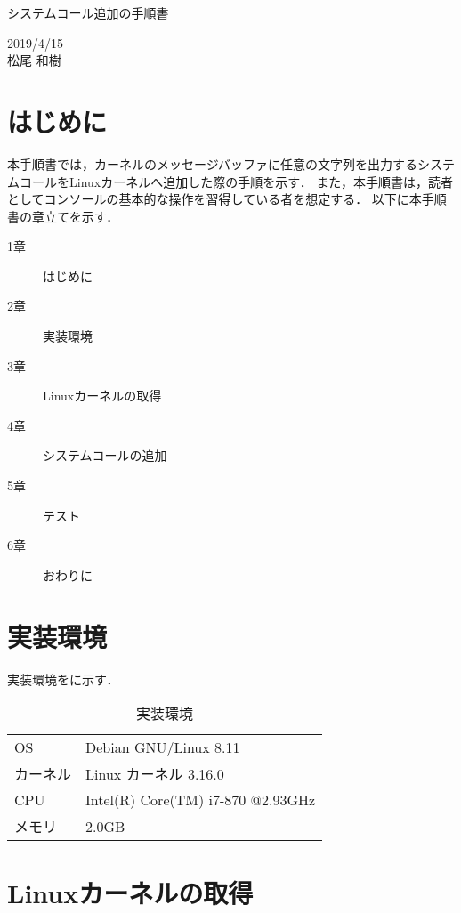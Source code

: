 \documentclass[12pt]{jsarticle}
\begin{document}
\begin{center}
{\LARGE システムコール追加の手順書}
\end{center}

\begin{flushright}
  2019/4/15\\
  松尾 和樹
\end{flushright}
\section{はじめに}
\label{sec:introduction}
本手順書では，カーネルのメッセージバッファに任意の文字列を出力するシステムコールをLinuxカーネルへ追加した際の手順を示す．
また，本手順書は，読者としてコンソールの基本的な操作を習得している者を想定する．
以下に本手順書の章立てを示す．
\begin{description}
\item[1章] はじめに
\item[2章] 実装環境
\item[3章] Linuxカーネルの取得
\item[4章] システムコールの追加
\item[5章] テスト
\item[6章] おわりに
\end{description}

\section{実装環境}\label{sec:environment}
実装環境をに示す．

\begin{table}[h]
  \begin{center}
    \caption{実装環境}\label{tab:environment}
    \begin{tabular}{l|l}
      \hline
      \hline
      OS & Debian GNU/Linux 8.11\\
      カーネル & Linux カーネル 3.16.0\\
      CPU & Intel(R) Core(TM) i7-870 @2.93GHz\\
      メモリ & 2.0GB\\
      \hline
    \end{tabular}
  \end{center}
\end{table}

\section{Linuxカーネルの取得}\label{sec:get kernel}
\end{document}
